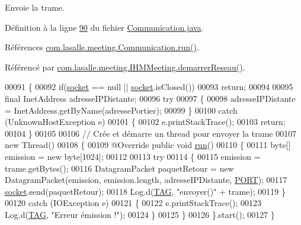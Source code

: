 Envoie la trame. 



Définition à la ligne \hyperlink{_communication_8java_source_l00090}{90} du fichier \hyperlink{_communication_8java_source}{Communication.\+java}.



Références \hyperlink{_communication_8java_source_l00296}{com.\+lasalle.\+meeting.\+Communication.\+run()}.



Référencé par \hyperlink{_i_h_m_meeting_8java_source_l00082}{com.\+lasalle.\+meeting.\+I\+H\+M\+Meeting.\+demarrer\+Reseau()}.


\begin{DoxyCode}
00091     \{
00092         \textcolor{keywordflow}{if}(\hyperlink{classcom_1_1lasalle_1_1meeting_1_1_communication_a2a538f36640aecebbb833bbaf1f03858}{socket} == null || \hyperlink{classcom_1_1lasalle_1_1meeting_1_1_communication_a2a538f36640aecebbb833bbaf1f03858}{socket}.isClosed())
00093             \textcolor{keywordflow}{return};
00094 
00095         \textcolor{keyword}{final} InetAddress adresseIPDistante;
00096         \textcolor{keywordflow}{try}
00097         \{
00098             adresseIPDistante = InetAddress.getByName(adressePortier);
00099         \}
00100         \textcolor{keywordflow}{catch} (UnknownHostException e)
00101         \{
00102             e.printStackTrace();
00103             \textcolor{keywordflow}{return};
00104         \}
00105 
00106         \textcolor{comment}{// Crée et démarre un thread pour envoyer la trame}
00107         \textcolor{keyword}{new} Thread()
00108         \{
00109             @Override \textcolor{keyword}{public} \textcolor{keywordtype}{void} \hyperlink{classcom_1_1lasalle_1_1meeting_1_1_communication_afe29bde1b4538990bd0a8c9b2d512efa}{run}()
00110             \{
00111                 byte[] emission = \textcolor{keyword}{new} byte[1024];
00112 
00113                 \textcolor{keywordflow}{try}
00114                 \{
00115                     emission = trame.getBytes();
00116                     DatagramPacket paquetRetour = \textcolor{keyword}{new} DatagramPacket(emission, emission.length, 
      adresseIPDistante, \hyperlink{classcom_1_1lasalle_1_1meeting_1_1_communication_abf48fd6a29d87d67f4941494404f1ea7}{PORT});
00117                     \hyperlink{classcom_1_1lasalle_1_1meeting_1_1_communication_a2a538f36640aecebbb833bbaf1f03858}{socket}.send(paquetRetour);
00118                     Log.d(\hyperlink{classcom_1_1lasalle_1_1meeting_1_1_communication_a5d58f88df1f20b4d61edbed9a82eccab}{TAG}, \textcolor{stringliteral}{"envoyer()"} + trame);
00119                 \}
00120                 \textcolor{keywordflow}{catch} (IOException e)
00121                 \{
00122                     e.printStackTrace();
00123                     Log.d(\hyperlink{classcom_1_1lasalle_1_1meeting_1_1_communication_a5d58f88df1f20b4d61edbed9a82eccab}{TAG}, \textcolor{stringliteral}{"Erreur émission !"});
00124                 \}
00125             \}
00126         \}.start();
00127     \}
\end{DoxyCode}
